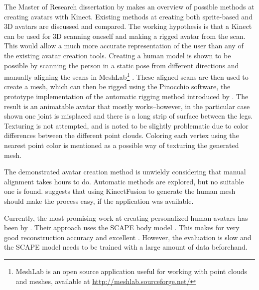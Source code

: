 The Master of Research dissertation by \citet{charpentier2011accurate} makes an overview of possible methods at creating avatars with Kinect. Existing methods at creating both sprite-based and 3D avatars are discussed and compared. The working hypothesis is that a Kinect can be used for 3D scanning oneself and making a rigged avatar from the scan. This would allow a much more accurate representation of the user than any of the existing avatar creation tools. Creating a human model is shown to be possible by scanning the person in a static pose from different directions and manually aligning the scans in MeshLab\footnote{MeshLab is an open source application useful for working with point clouds and meshes, available at \url{http://meshlab.sourceforge.net/}} \citep{meshlab}. These aligned scans are then used to create a mesh, which can then be rigged using the Pinocchio software, the prototype implementation of the automatic rigging method introduced by \citep{baran2007automatic}. The result is an animatable avatar that mostly works--however, in the particular case shown one joint is misplaced and there is a long strip of surface between the legs. Texturing is not attempted, and is noted to be slightly problematic due to color differences between the different point clouds. Coloring each vertex using the nearest point color is mentioned as a possible way of texturing the generated mesh. \citep{charpentier2011accurate}

The demonstrated avatar creation method is unwieldy considering that manual alignment takes hours to do. Automatic methods are explored, but no suitable one is found. \citeauthor{charpentier2011accurate} suggests that using KinectFusion to generate the human mesh should make the process easy, if the application was available. \citep{charpentier2011accurate}


Currently, the most promising work at creating personalized human avatars has been by \citet{weiss2011home}. Their approach uses the SCAPE body model \citep{anguelov2005scape}. This makes for very good reconstruction accuracy and excellent . However, the evaluation is slow and the SCAPE model needs to be trained with a large amount of data beforehand.

